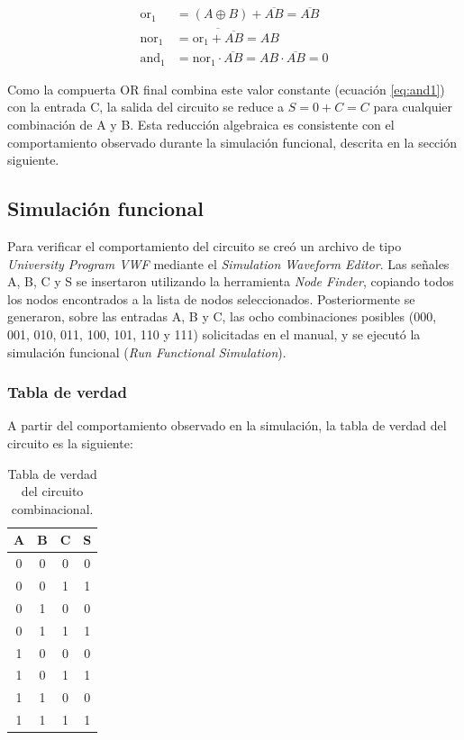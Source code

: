 \begin{align}
  \text{or}_1 &= (A \oplus B) + \overline{AB} = \overline{AB} \label{eq:or1}\\
  \text{nor}_1 &= \overline{\text{or}_1 + \overline{AB}} = AB \label{eq:nor1}\\
  \text{and}_1 &= \text{nor}_1 \cdot \overline{AB} = AB \cdot \overline{AB} = 0
    \label{eq:and1}
\end{align}

Como la compuerta OR final combina este valor constante (ecuación \ref{eq:and1}) con la
entrada C, la salida del circuito se reduce a $S = 0 + C = C$ para cualquier
combinación de A y B. Esta reducción algebraica es consistente con el comportamiento
observado durante la simulación funcional, descrita en la sección siguiente.

\subsection{Simulación funcional}

Para verificar el comportamiento del circuito se creó un archivo de tipo
\textit{University Program VWF} mediante el \textit{Simulation Waveform Editor}. Las
señales A, B, C y S se insertaron utilizando la herramienta \textit{Node Finder},
copiando todos los nodos encontrados a la lista de nodos seleccionados. Posteriormente
se generaron, sobre las entradas A, B y C, las ocho combinaciones posibles
(000, 001, 010, 011, 100, 101, 110 y 111) solicitadas en el manual, y se ejecutó la
simulación funcional (\textit{Run Functional Simulation}).

\subsubsection{Tabla de verdad}

A partir del comportamiento observado en la simulación, la tabla de verdad del circuito
es la siguiente:

\begin{table}[H]
  \centering
  \begin{tabular}{ccc|c}
    \toprule
    A & B & C & S \\
    \midrule
    0 & 0 & 0 & 0 \\
    0 & 0 & 1 & 1 \\
    0 & 1 & 0 & 0 \\
    0 & 1 & 1 & 1 \\
    1 & 0 & 0 & 0 \\
    1 & 0 & 1 & 1 \\
    1 & 1 & 0 & 0 \\
    1 & 1 & 1 & 1 \\
    \bottomrule
  \end{tabular}
  \caption{Tabla de verdad del circuito combinacional.}
  \label{tab:verdad}
\end{table}

